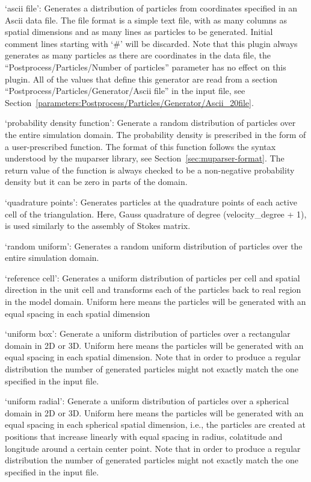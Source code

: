 \begin{itemize}
`ascii file': Generates a distribution of particles from coordinates specified in an Ascii data file. The file format is a simple text file, with as many columns as spatial dimensions and as many lines as particles to be generated. Initial comment lines starting with `#' will be discarded. Note that this plugin always generates as many particles as there are coordinates in the data file, the ``Postprocess/Particles/Number of particles'' parameter has no effect on this plugin. All of the values that define this generator are read from a section ``Postprocess/Particles/Generator/Ascii file'' in the input file, see Section~\ref{parameters:Postprocess/Particles/Generator/Ascii_20file}.

`probability density function': Generate a random distribution of particles over the entire simulation domain. The probability density is prescribed in the form of a user-prescribed function. The format of this function follows the syntax understood by the muparser library, see Section~\ref{sec:muparser-format}. The return value of the function is always checked to be a non-negative probability density but it can be zero in parts of the domain.

`quadrature points': Generates particles at the quadrature points of each active cell of the triangulation. Here, Gauss quadrature of degree (velocity\_degree + 1), is used similarly to the assembly of Stokes matrix.

`random uniform': Generates a random uniform distribution of particles over the entire simulation domain.

`reference cell': Generates a uniform distribution of particles per cell and spatial direction in the unit cell and transforms each of the particles back to real region in the model domain. Uniform here means the particles will be generated with an equal spacing in each spatial dimension

`uniform box': Generate a uniform distribution of particles over a rectangular domain in 2D or 3D. Uniform here means the particles will be generated with an equal spacing in each spatial dimension. Note that in order to produce a regular distribution the number of generated particles might not exactly match the one specified in the input file.

`uniform radial': Generate a uniform distribution of particles over a spherical domain in 2D or 3D. Uniform here means the particles will be generated with an equal spacing in each spherical spatial dimension, i.e., the particles are created at positions that increase linearly with equal spacing in radius, colatitude and longitude around a certain center point. Note that in order to produce a regular distribution the number of generated particles might not exactly match the one specified in the input file.



\end{itemize}
